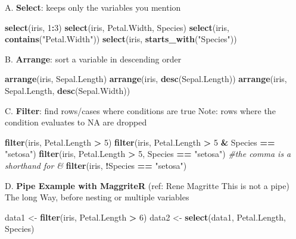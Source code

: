 \documentclass[]{book}
\newenvironment{Shaded}{\begin{snugshade}}{\end{snugshade}}
\newcommand{\CommentTok}[1]{\textcolor[rgb]{0.56,0.35,0.01}{\textit{#1}}}
\newcommand{\DecValTok}[1]{\textcolor[rgb]{0.00,0.00,0.81}{#1}}
\newcommand{\KeywordTok}[1]{\textcolor[rgb]{0.13,0.29,0.53}{\textbf{#1}}}
\newcommand{\NormalTok}[1]{#1}
\newcommand{\OperatorTok}[1]{\textcolor[rgb]{0.81,0.36,0.00}{\textbf{#1}}}
\newcommand{\StringTok}[1]{\textcolor[rgb]{0.31,0.60,0.02}{#1}}
\begin{document}
A. \textbf{Select}: keeps only the variables you mention

\begin{Shaded}
\begin{Highlighting}[]
\KeywordTok{select}\NormalTok{(iris, }\DecValTok{1}\OperatorTok{:}\DecValTok{3}\NormalTok{)}
\KeywordTok{select}\NormalTok{(iris, Petal.Width, Species)}
\KeywordTok{select}\NormalTok{(iris, }\KeywordTok{contains}\NormalTok{(}\StringTok{"Petal.Width"}\NormalTok{))}
\KeywordTok{select}\NormalTok{(iris, }\KeywordTok{starts_with}\NormalTok{(}\StringTok{"Species"}\NormalTok{))}
\end{Highlighting}
\end{Shaded}

B. \textbf{Arrange}: sort a variable in descending order

\begin{Shaded}
\begin{Highlighting}[]
\KeywordTok{arrange}\NormalTok{(iris, Sepal.Length)}
\KeywordTok{arrange}\NormalTok{(iris, }\KeywordTok{desc}\NormalTok{(Sepal.Length))}
\KeywordTok{arrange}\NormalTok{(iris, Sepal.Length, }\KeywordTok{desc}\NormalTok{(Sepal.Width))}
\end{Highlighting}
\end{Shaded}

C. \textbf{Filter}: find rows/cases where conditions are true
Note: rows where the condition evaluates to NA are dropped

\begin{Shaded}
\begin{Highlighting}[]
\KeywordTok{filter}\NormalTok{(iris, Petal.Length }\OperatorTok{>}\StringTok{ }\DecValTok{5}\NormalTok{)}
\KeywordTok{filter}\NormalTok{(iris, Petal.Length }\OperatorTok{>}\StringTok{ }\DecValTok{5} \OperatorTok{&}\StringTok{ }\NormalTok{Species }\OperatorTok{==}\StringTok{ "setosa"}\NormalTok{)}
\KeywordTok{filter}\NormalTok{(iris, Petal.Length }\OperatorTok{>}\StringTok{ }\DecValTok{5}\NormalTok{, Species }\OperatorTok{==}\StringTok{ "setosa"}\NormalTok{) }\CommentTok{#the comma is a shorthand for &}
\KeywordTok{filter}\NormalTok{(iris, }\OperatorTok{!}\NormalTok{Species }\OperatorTok{==}\StringTok{ "setosa"}\NormalTok{)}
\end{Highlighting}
\end{Shaded}

D. \textbf{Pipe Example with MaggriteR} (ref: Rene Magritte This is not a pipe)
The long Way, before nesting or multiple variables

\begin{Shaded}
\begin{Highlighting}[]
\NormalTok{data1 <-}\StringTok{ }\KeywordTok{filter}\NormalTok{(iris, Petal.Length }\OperatorTok{>}\StringTok{ }\DecValTok{6}\NormalTok{)}
\NormalTok{data2 <-}\StringTok{ }\KeywordTok{select}\NormalTok{(data1, Petal.Length, Species)}
\end{Highlighting}
\end{Shaded}
\end{document}
